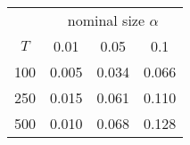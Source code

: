 % 
\begin{tabular}{cccc}
  \hline
  & \multicolumn{3}{c}{nominal size $\alpha$} \\
 $T$ & 0.01 & 0.05 & 0.1 \\
 \hline
100 & 0.005 & 0.034 & 0.066 \\ 
  250 & 0.015 & 0.061 & 0.110 \\ 
  500 & 0.010 & 0.068 & 0.128 \\ 
   \hline
\end{tabular}
